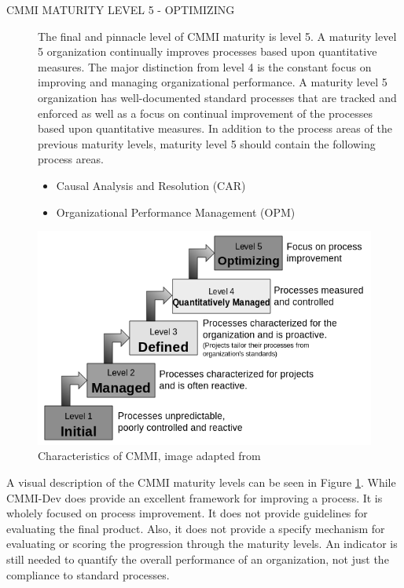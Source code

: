 \documentclass[SDSUThesis.tex]{subfiles}
\begin{document}
\begin{description}
        \item[CMMI MATURITY LEVEL 5 - OPTIMIZING]
            The final and pinnacle level of CMMI maturity is level 5.  
            A maturity level 5 organization
            continually improves processes based upon quantitative measures.  
            The major distinction from 
            level 4 is the constant focus on improving and managing 
            organizational performance.  A maturity level
            5 organization has well-documented standard processes that are 
            tracked and enforced as well as
            a focus on continual improvement of the processes based upon 
            quantitative measures.  In addition to the process areas of the 
            previous maturity levels, maturity
            level 5 should contain the following process areas.
            \begin{itemize}
                \item Causal Analysis and Resolution (CAR)
                \item Organizational Performance Management (OPM)
            \end{itemize}
    \end{description}

    \begin{figure}[here]
        \centering
        \includegraphics[scale=.7]{images/cmmi.png}
        \caption[Characteristics of CMMI]{Characteristics of CMMI, image adapted from  \cite{Godfrey} }
        \label{fig:cmmi}
    \end{figure}

    A visual description of the CMMI maturity levels can be seen in Figure \ref{fig:cmmi}.  
    While CMMI-Dev does provide an excellent framework for improving a process.  It
    is wholely focused on process improvement.  It does not provide guidelines
    for evaluating the final product.  
    Also, it does not provide a specify mechanism for evaluating
    or scoring the progression through the maturity levels.  
    An indicator is still needed to quantify the overall performance of an organization, not
    just the compliance to standard processes.  
\end{document}
